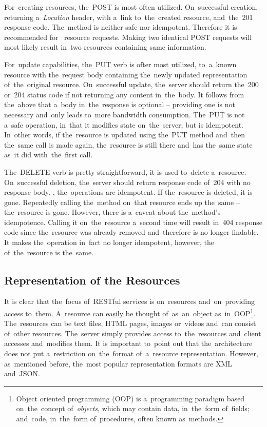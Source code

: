 For~creating resources, the~POST is most often utilized. On~successful creation,
returning a~\textit{Location} header, with a~link to~the~created resource,
and~the~201 response code. The~method is neither safe nor idempotent. Therefore
it is recommended for~ resource requests. Making two
identical POST requests will most likely result in~two resources containing same
information.

For~update capabilities, the~PUT verb is ofter most utilized, 
to~a~known resource with the~request body containing the~newly updated
representation of~the~original resource. On~successful update, the~server should
return the~200 or~204 status code if not returning any content in~the~body. It
follows from the~above that a~body in~the~response is optional -- providing one
is not necessary and~only leads to~more bandwidth consumption. The~PUT is not
a~safe operation, in~that it modifies state on~the~server, but is idempotent.
In~other words, if the~resource is updated using the~PUT method and~then
the~same call is made again, the~resource is still there and~has the~same state
as~it did with~the~first call.

The~DELETE verb is pretty straightforward, it is used to~delete a~resource.
On~successful deletion, the~server should return response code of~204 with no
response body. , the~operations are idempotent. If
the~resource is deleted, it is gone. Repeatedly calling the~method on~that
resource ends up the~same -- the~resource is gone. However, there is a~caveat
about the~method's idempotence. Calling it on~the~resource a~second time will
result in~404 response code since the~resource was already removed and~therefore
is no longer findable. It makes the~operation in~fact no longer idempotent,
however, the~ of~the~resource is the~same.


\subsection{Representation of the Resources}
It is clear that the~focus of~RESTful services is on~resources and~on~providing
access to~them. A~resource can easily be thought of~as~an~object
as~in~OOP\footnote{Object oriented programming (OOP) is a~programming paradigm
based on~the~concept of~\textit{objects}, which may contain data, in~the~form
of~fields; and~code, in~the~form of~procedures, often known as~methods.}.
The~resources can be text files, HTML pages, images or~videos and~can consist
of~other resources. The~server simply provides access to~the~resources
and~client accesses and~modifies them. It is important to~point out that
the~architecture does not put a~restriction on~the~format of~a~resource
representation. However, as~mentioned before, the~most popular representation
formats are XML and~JSON.

